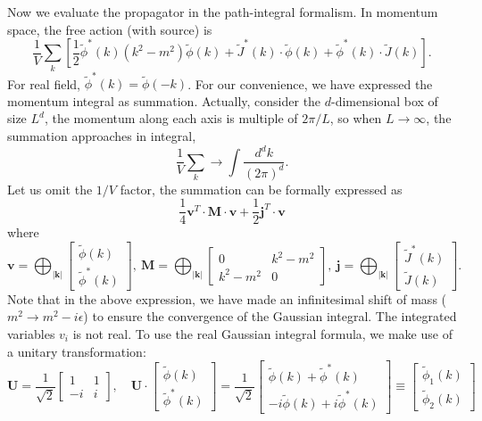 \documentclass[aps,prb,superscriptaddress,nofootinbib]{revtex4}
\begin{document}
Now we evaluate the propagator in the path-integral formalism.
In momentum space, the free action (with source) is 
\begin{equation*}
	\frac{1}{V}\sum_k \left[\frac{1}{2}\tilde\phi^*(k)( k^2-m^2)\tilde\phi(k)+\tilde J^*(k)\cdot\tilde\phi(k)+\tilde\phi^*(k)\cdot\tilde J(k)\right].
\end{equation*}
For real field, $\tilde\phi^*(k) = \tilde\phi(-k)$.
For our convenience, we have expressed the momentum integral as summation.
Actually, consider the $d$-dimensional box of size $L^d$, the momentum along each axis is multiple of $2\pi/L$, so when $L\rightarrow \infty$, the summation approaches in integral,
\begin{equation*}
	\frac{1}{V}\sum_k \rightarrow \int \frac{d^d k}{(2\pi)^d}.
\end{equation*}
Let us omit the $1/V$ factor, the summation can be formally expressed as
\begin{equation}
	\frac{1}{4}\mathbf{v}^T \cdot \mathbf M\cdot \mathbf{v} + \frac{1}{2}\mathbf{j}^T \cdot \mathbf{v}
\end{equation}
where
\begin{equation*}
	\mathbf v = \bigoplus_{|\mathbf k|} \left[
	\begin{array}{c}
		\tilde{\phi}(k) \\ 
		\tilde{\phi}^*(k) 
	\end{array}\right],\ 
	\mathbf M = \bigoplus_{|\mathbf k|} \left[
	\begin{array}{cc} 
		0 & k^2-m^2 \\ 
		k^2-m^2 & 0 
	\end{array}\right],\ 
	\mathbf j = \bigoplus_{|\mathbf k|} \left[
	\begin{array}{c}
		\tilde{J}^*(k) \\ 
		\tilde{J}(k) 
	\end{array}\right].
\end{equation*}
Note that in the above expression, we have made an infinitesimal shift of mass ($m^2 \rightarrow m^2 - i\epsilon$) to ensure the convergence of the Gaussian integral.
The integrated variables $v_i$ is not real.
To use the real Gaussian integral formula, we make use of a unitary transformation: 
\begin{equation*}
	\mathbf U = \frac{1}{\sqrt 2} \left[\begin{array}{cc}
		1 & 1 \\
		-i & i
	\end{array}\right], \quad
	\mathbf U \cdot \left[
	\begin{array}{c}
		\tilde{\phi}(k) \\ 
		\tilde{\phi}^*(k) 
	\end{array}\right] 
	= \frac{1}{\sqrt 2}\left[
	\begin{array}{c}
		\tilde\phi(k)+\tilde\phi^*(k) \\ 
		-i\tilde\phi(k)+i\tilde\phi^*(k)
	\end{array}\right]
	\equiv \left[
	\begin{array}{c}
		\tilde\phi_1(k) \\ 
		\tilde\phi_2(k) 
	\end{array}\right]
\end{equation*}
\end{document}

